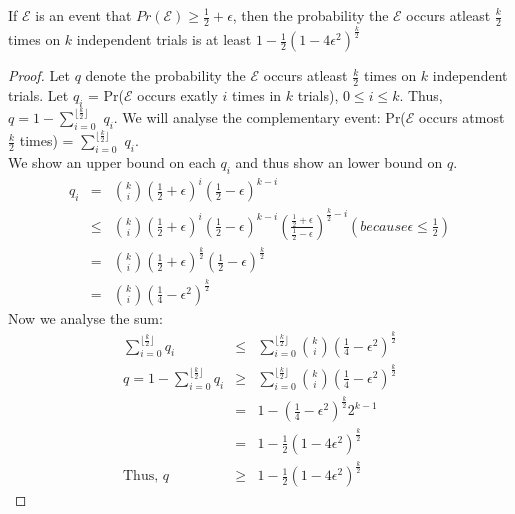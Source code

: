 \begin{lemma}
If $\mathcal{E}$ is an event that $Pr(\mathcal{E}) \geq \frac{1}{2} + \epsilon $, then the probability the $\mathcal{E}$ occurs atleast $\frac {k}{2}$ times on $k$ independent trials is at least 
$1-\frac{1}{2}(1-4\epsilon^2)^\frac{k}{2}$
\end{lemma}
\begin{proof}
Let $q$ denote the probability the $\mathcal{E}$ occurs atleast $\frac {k}{2}$ times on $k$ independent trials.
Let $q_i$ = Pr($\mathcal{E}$ occurs exatly $i$ times in $k$ trials), $0 \leq i \leq k$. Thus,
$q = 1 - \sum_{i=0}^{\lfloor\frac{k}{2}\rfloor}$ $q_i$. We will analyse the complementary event:
Pr($\mathcal{E}$ occurs atmost $\frac{k}{2}$ times) = $\sum_{i=0}^{\lfloor\frac{k}{2}\rfloor}$ $q_i$. \\ 
We show an upper bound on each $q_i$ and thus show an lower bound on $q$.
\begin{eqnarray*}
q_i & = & {k \choose i} (\frac{1}{2} + \epsilon)^{i} (\frac{1}{2} - \epsilon)^ {k-i} \\
& \leq & {k\choose i} \left(\frac{1}{2} + \epsilon\right)^{i} \left(\frac{1}{2} - \epsilon\right)^ {k-i} \left(\frac{\frac{1}{2} + \epsilon}{\frac{1}{2} - \epsilon}\right)^{\frac{k}{2} - i}  (because \epsilon \le \frac{1}{2} ) \\
& = & {k\choose i}\left(\frac{1}{2} + \epsilon\right)^{\frac{k}{2}}\left(\frac{1}{2} - \epsilon\right)^{\frac{k}{2}} \\
&= & {k\choose i} \left(\frac{1}{4} - \epsilon^2\right)^{\frac{k}{2}}
\end{eqnarray*}
Now we analyse the sum:
\begin{eqnarray*}
\sum_{i=0}^{\lfloor\frac{k}{2}\rfloor}q_i & \leq & \sum_{i=0}^{\lfloor\frac{k}{2}\rfloor}{k\choose i} \left(\frac{1}{4} - \epsilon^2\right)^{\frac{k}{2}} \\
q = 1 - \sum_{i=0}^{\lfloor\frac{k}{2}\rfloor}q_i & \geq & \sum_{i=0}^{\lfloor\frac{k}{2}\rfloor}{k\choose i} \left(\frac{1}{4} - \epsilon^2\right)^{\frac{k}{2}} \\
& = & 1 - \left(\frac{1}{4} - \epsilon^2\right)^{\frac{k}{2}} 2^{k-1} \\
& = & 1 - \frac{1}{2} \left(1 - 4\epsilon^2\right)^{\frac{k}{2}} \\
\textrm {Thus, } q & \ge & 1 - \frac{1}{2} \left(1 - 4\epsilon^2\right)^{\frac{k}{2}}
\end{eqnarray*}
\end{proof}

